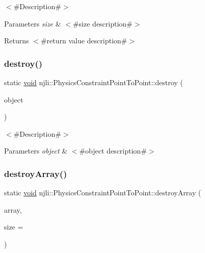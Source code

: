 $<$\#\+Description\#$>$


\begin{DoxyParams}{Parameters}
{\em size} & $<$\#size description\#$>$\\
\hline
\end{DoxyParams}
\begin{DoxyReturn}{Returns}
$<$\#return value description\#$>$ 
\end{DoxyReturn}
\mbox{\label{classnjli_1_1_physics_constraint_point_to_point_a99954ab0a125669815fcde1d80868f87}} 
\subsubsection{\texorpdfstring{destroy()}{destroy()}}
{\footnotesize\ttfamily static \mbox{\hyperlink{_thread_8h_af1e856da2e658414cb2456cb6f7ebc66}{void}} njli\+::\+Physics\+Constraint\+Point\+To\+Point\+::destroy (\begin{DoxyParamCaption}\item[{\mbox{\hyperlink{classnjli_1_1_physics_constraint_point_to_point}{Physics\+Constraint\+Point\+To\+Point}} $\ast$}]{object }\end{DoxyParamCaption})\hspace{0.3cm}{\ttfamily [static]}}

$<$\#\+Description\#$>$


\begin{DoxyParams}{Parameters}
{\em object} & $<$\#object description\#$>$ \\
\hline
\end{DoxyParams}
\mbox{\label{classnjli_1_1_physics_constraint_point_to_point_a44225e2e07a7792db8d50f752621c526}} 
\subsubsection{\texorpdfstring{destroy\+Array()}{destroyArray()}}
{\footnotesize\ttfamily static \mbox{\hyperlink{_thread_8h_af1e856da2e658414cb2456cb6f7ebc66}{void}} njli\+::\+Physics\+Constraint\+Point\+To\+Point\+::destroy\+Array (\begin{DoxyParamCaption}\item[{\mbox{\hyperlink{classnjli_1_1_physics_constraint_point_to_point}{Physics\+Constraint\+Point\+To\+Point}} $\ast$$\ast$}]{array,  }\item[{const \mbox{\hyperlink{_util_8h_a10e94b422ef0c20dcdec20d31a1f5049}{u32}}}]{size = {} }\end{DoxyParamCaption})\hspace{0.3cm}{\ttfamily [static]}}

